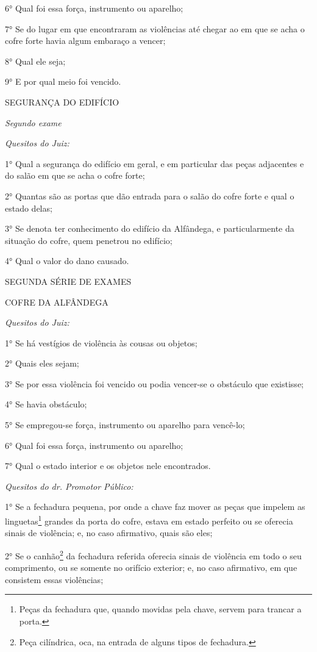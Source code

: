6° Qual foi essa força, instrumento ou aparelho;

7° Se do lugar em que encontraram as violências até chegar ao em que se
acha o cofre forte havia algum embaraço a vencer;

8° Qual ele seja;

9° E por qual meio foi vencido.

SEGURANÇA DO EDIFÍCIO

\emph{Segundo exame}

\emph{Quesitos do Juiz:}

1° Qual a segurança do edifício em geral, e em particular das peças
adjacentes e do salão em que se acha o cofre forte;

2° Quantas são as portas que dão entrada para o salão do cofre forte e
qual o estado delas;

3° Se denota ter conhecimento do edifício da Alfândega, e
particularmente da situação do cofre, quem penetrou no edifício;

4° Qual o valor do dano causado.

SEGUNDA SÉRIE DE EXAMES

COFRE DA ALFÂNDEGA

\emph{Quesitos do Juiz:}

1° Se há vestígios de violência às cousas ou objetos;

2° Quais eles sejam;

3° Se por essa violência foi vencido ou podia vencer-se o obstáculo que
existisse;

4° Se havia obstáculo;

5° Se empregou-se força, instrumento ou aparelho para vencê-lo;

6° Qual foi essa força, instrumento ou aparelho;

7° Qual o estado interior e os objetos nele encontrados.

\emph{Quesitos do dr. Promotor Público:}

1° Se a fechadura pequena, por onde a chave faz mover as peças que
impelem as linguetas\footnote{Peças da fechadura que, quando movidas
  pela chave, servem para trancar a porta.} grandes da porta do cofre,
estava em estado perfeito ou se oferecia sinais de violência; e, no caso
afirmativo, quais são eles;

2° Se o canhão\footnote{Peça cilíndrica, oca, na entrada de alguns tipos
  de fechadura.} da fechadura referida oferecia sinais de violência em
todo o seu comprimento, ou se somente no orifício exterior; e, no caso
afirmativo, em que consistem essas violências;

